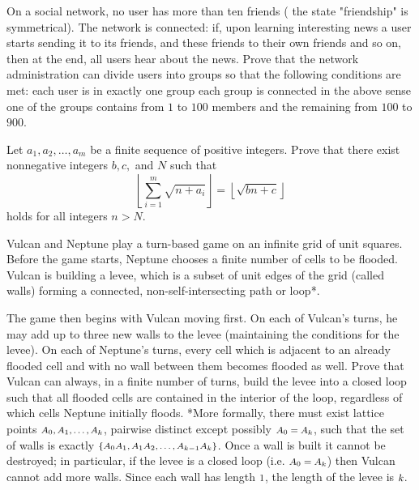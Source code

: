 \documentclass[11pt]{scrartcl}
\begin{document}
\begin{problem}[6029540617185205962]
On a social network, no user has more than ten friends ( the state "friendship" is symmetrical). The network is connected: if, upon learning interesting news a user starts sending it to its friends, and these friends to their own friends and so on, then at the end, all users hear about the news.
Prove that the network administration can divide users into groups so that the following conditions are met:
each user is in exactly one group
each group is connected in the above sense
one of the groups contains from $1$ to $100$ members and the remaining from $100$ to $900$.
\end{problem}
\begin{problem}[6051857606097163028]
Let $a_1,a_2,\dots,a_m$ be a finite sequence of positive integers. Prove that there exist nonnegative integers $b,c,$ and $N$ such that$$\left\lfloor \sum_{i=1}^m \sqrt{n+a_i} \right\rfloor =\left\lfloor \sqrt{bn+c} \right\rfloor$$holds for all integers $n>N.$
\end{problem}
\begin{problem}[6064010778487493566]
Vulcan and Neptune play a turn-based game on an infinite grid of unit squares. Before the game starts, Neptune chooses a finite number of cells to be flooded. Vulcan is building a levee, which is a subset of unit edges of the grid (called walls) forming a connected, non-self-intersecting path or loop*.

The game then begins with Vulcan moving first. On each of Vulcan’s turns, he may add up to three new walls to the levee (maintaining the conditions for the levee). On each of Neptune’s turns, every cell which is adjacent to an already flooded cell and with no wall between them becomes flooded as well. Prove that Vulcan can always, in a finite number of turns, build the levee into a closed loop such that all flooded cells are contained in the interior of the loop, regardless of which cells Neptune initially floods.
*More formally, there must exist lattice points $\mbox{\footnotesize \(A_0, A_1, \dotsc, A_k\)}$, pairwise distinct except possibly $\mbox{\footnotesize \(A_0 = A_k\)}$, such that the set of walls is exactly $\mbox{\footnotesize \(\{A_0A_1, A_1A_2, \dotsc , A_{k-1}A_k\}\)}$. Once a wall is built it cannot be destroyed; in particular, if the levee is a closed loop (i.e. $\mbox{\footnotesize \(A_0 = A_k\)}$) then Vulcan cannot add more walls. Since each wall has length $\mbox{\footnotesize \(1\)}$, the length of the levee is $\mbox{\footnotesize \(k\)}$.
\end{problem}
\end{document}
